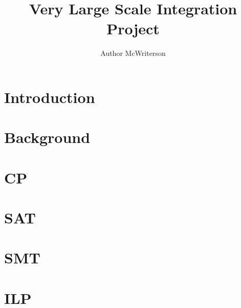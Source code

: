 \documentclass[a4paper, 11pt]{article}
\title{Very Large Scale Integration Project}
\author{Author McWriterson}
\begin{document}
\maketitle
\tableofcontents


\section{Introduction}
    

\section{Background}
    

\section{CP}
    

\section{SAT}
    

\section{SMT}
    

\section{ILP}
    




\end{document}
